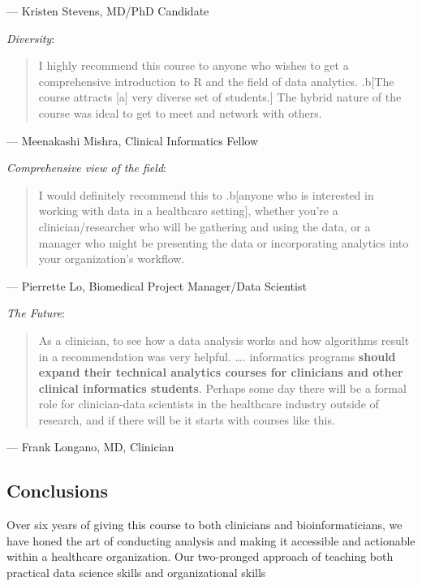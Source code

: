 --- Kristen Stevens, MD/PhD Candidate

\emph{Diversity}:

\begin{quote}
I highly recommend this course to anyone who wishes to get a
comprehensive introduction to R and the field of data analytics.
.b{[}The course attracts {[}a{]} very diverse set of students.{]} The
hybrid nature of the course was ideal to get to meet and network with
others.
\end{quote}

--- Meenakashi Mishra, Clinical Informatics Fellow

\emph{Comprehensive view of the field}:

\begin{quote}
I would definitely recommend this to .b{[}anyone who is interested in
working with data in a healthcare setting{]}, whether you're a
clinician/researcher who will be gathering and using the data, or a
manager who might be presenting the data or incorporating analytics into
your organization's workflow.
\end{quote}

--- Pierrette Lo, Biomedical Project Manager/Data Scientist

\emph{The Future}:

\begin{quote}
As a clinician, to see how a data analysis works and how algorithms
result in a recommendation was very helpful. \ldots. informatics
programs \textbf{should expand their technical analytics courses for
clinicians and other clinical informatics students}. Perhaps some day
there will be a formal role for clinician-data scientists in the
healthcare industry outside of research, and if there will be it starts
with courses like this.
\end{quote}

--- Frank Longano, MD, Clinician

\hypertarget{conclusions}{%
\subsection{Conclusions}\label{conclusions}}

Over six years of giving this course to both clinicians and
bioinformaticians, we have honed the art of conducting analysis and
making it accessible and actionable within a healthcare organization.
Our two-pronged approach of teaching both practical data science skills
and organizational skills

